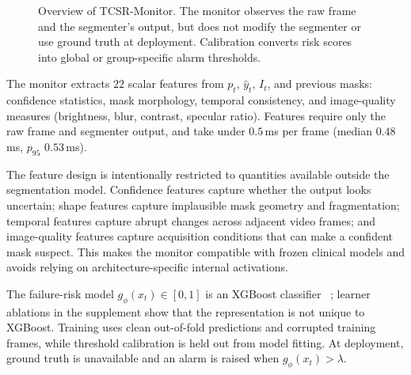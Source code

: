 \documentclass[runningheads]{llncs}
\newcommand{\monitor}{TCSR-Monitor}
\begin{document}
\begin{figure}[t]
\centering
\small
\setlength{\tabcolsep}{3pt}
\caption{Overview of \monitor{}. The monitor observes the raw frame and the
segmenter's output, but does not modify the segmenter or use ground truth at
deployment. Calibration converts risk scores into global or group-specific
alarm thresholds.}
\label{fig:pipeline}
\end{figure}

\noindent The monitor extracts $22$ scalar features from $p_t$, $\hat y_t$,
$I_t$, and previous masks: confidence statistics, mask morphology, temporal
consistency, and image-quality measures (brightness, blur, contrast, specular
ratio). Features require only the raw frame and segmenter output, and take
under $0.5$\,ms per frame (median $0.48$\,ms, $p_{95}$ $0.53$\,ms).

The feature design is intentionally restricted to quantities available outside
the segmentation model. Confidence features capture whether the output looks
uncertain; shape features capture implausible mask geometry and fragmentation;
temporal features capture abrupt changes across adjacent video frames; and
image-quality features capture acquisition conditions that can make a confident
mask suspect. This makes the monitor compatible with frozen clinical models
and avoids relying on architecture-specific internal activations.

The failure-risk model $g_\phi(x_t)\in[0,1]$ is an XGBoost classifier
~\cite{ref:xgboost}; learner ablations in the supplement show that the
representation is not unique to XGBoost. Training uses clean out-of-fold
predictions and corrupted training frames, while threshold calibration is held
out from model fitting. At deployment, ground truth is unavailable and an alarm
is raised when $g_\phi(x_t)>\lambda$.
\end{document}
